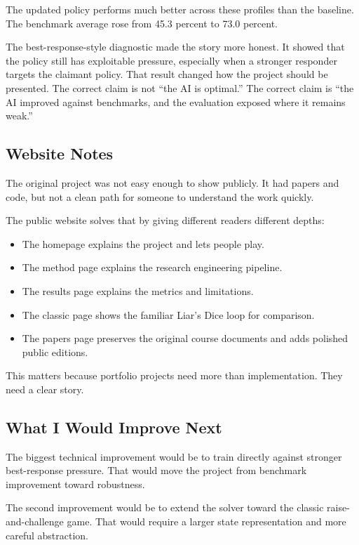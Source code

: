 \documentclass[
]{article}
\providecommand{\tightlist}{%
  \setlength{\itemsep}{0pt}\setlength{\parskip}{0pt}}
\begin{document}
The updated policy performs much better across these profiles than the
baseline. The benchmark average rose from 45.3 percent to 73.0 percent.

The best-response-style diagnostic made the story more honest. It showed
that the policy still has exploitable pressure, especially when a
stronger responder targets the claimant policy. That result changed how
the project should be presented. The correct claim is not ``the AI is
optimal.'' The correct claim is ``the AI improved against benchmarks,
and the evaluation exposed where it remains weak.''

\subsection{Website Notes}\label{website-notes}

The original project was not easy enough to show publicly. It had papers
and code, but not a clean path for someone to understand the work
quickly.

The public website solves that by giving different readers different
depths:

\begin{itemize}
\tightlist
\item
  The homepage explains the project and lets people play.
\item
  The method page explains the research engineering pipeline.
\item
  The results page explains the metrics and limitations.
\item
  The classic page shows the familiar Liar's Dice loop for comparison.
\item
  The papers page preserves the original course documents and adds
  polished public editions.
\end{itemize}

This matters because portfolio projects need more than implementation.
They need a clear story.

\subsection{What I Would Improve Next}\label{what-i-would-improve-next}

The biggest technical improvement would be to train directly against
stronger best-response pressure. That would move the project from
benchmark improvement toward robustness.

The second improvement would be to extend the solver toward the classic
raise-and-challenge game. That would require a larger state
representation and more careful abstraction.
\end{document}
